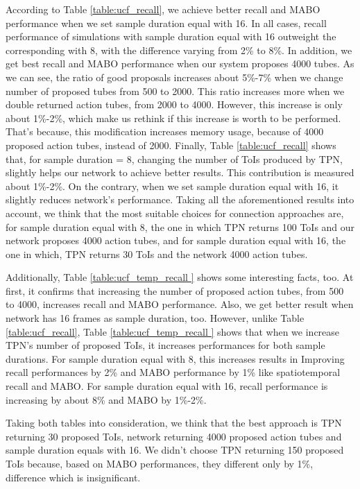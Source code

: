 According to Table \ref{table:ucf_recall}, we achieve better recall and MABO performance when we set sample duration equal with 16.
In all cases,  recall performance of simulations with sample duration equal with 16 outweight the corresponding with 8, with the difference
varying from 2\% to 8\%. In addition, we get best recall and MABO performance when our system proposes 4000 tubes. As we can see,
the ratio of good proposals increases about 5\%-7\% when we change number of proposed tubes from 500 to 2000. This ratio increases more
when we double returned action tubes, from 2000 to 4000. However, this increase is only about 1\%-2\%, which make us rethink if this increase
is worth to be performed. That's because, this modification increases memory usage, because of 4000 proposed action tubes, instead of
2000. Finally, Table \ref{table:ucf_recall} shows that, for sample duration = 8, changing the number of ToIs produced by TPN, slightly
helps our network to achieve better results. This contribution is measured about 1\%-2\%.
On the contrary, when we set sample duration equal with 16, it slightly reduces network's performance. Taking all the aforementioned
results into account, we think that the most suitable choices for connection approaches are, for sample duration equal with 8, the one in
which TPN returns 100 ToIs and our network proposes 4000 action tubes, and for sample duration equal with 16, the one in which,
TPN returns 30 ToIs and the network 4000 action tubes. \par
Additionally, Table \ref{table:ucf_temp_recall } shows some interesting facts, too. At first, it confirms that increasing the number of proposed
action tubes, from 500 to 4000, increases recall and MABO performance. Also, we get better result when network has 16 frames as sample
duration, too. However, unlike Table \ref{table:ucf_recall}, Table \ref{table:ucf_temp_recall } shows that when we increase TPN's number
of proposed ToIs, it increases performances for both sample durations. For sample duration equal with 8, this increases results in Improving
recall performances by 2\% and MABO performance by 1\% like spatiotemporal recall and MABO. For sample duration equal with 16, recall
performance is increasing by about 8\% and MABO by 1\%-2\%.  \par
Taking both tables into consideration, we think that the best approach is TPN returning 30 proposed ToIs, network returning 4000 proposed
action tubes and sample duration equals with 16. We didn't choose TPN returning 150 proposed ToIs because, based on MABO performances,
they different only by 1\%, difference which is insignificant.


